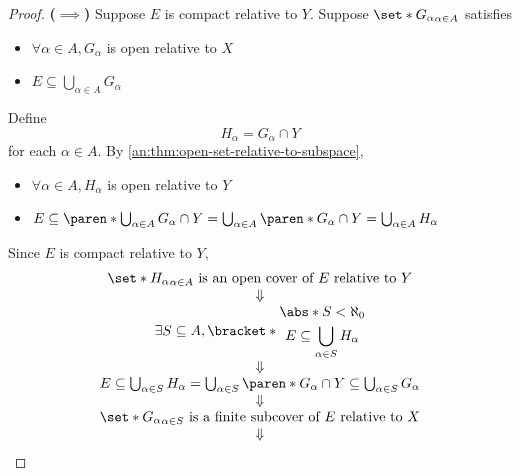 \begin{proof}
  \textbf{($\implies$)} Suppose $E$ is compact relative to $Y$. Suppose $\set*{G_{\alpha}}_{\alpha \in A}$ satisfies
  \begin{itemize}
    \item $\forall \alpha \in A, G_{\alpha}$ is open relative to $X$
    \item $E \subseteq \bigcup_{\alpha \in A} G_{\alpha}$
  \end{itemize}
  Define
  \[
    H_{\alpha} = G_{\alpha} \cap Y
  \]
  for each $\alpha \in A$. By \cref{an:thm:open-set-relative-to-subspace},
  \begin{itemize}
    \item $\forall \alpha \in A, H_{\alpha}$ is open relative to $Y$
    \item $E \subseteq \paren*{\bigcup_{\alpha \in A} G_{\alpha}} \cap Y =
            \bigcup_{\alpha \in A} \paren*{G_{\alpha} \cap Y} = \bigcup_{\alpha \in A} H_{\alpha}$
  \end{itemize}
  Since $E$ is compact relative to $Y$,
  \[
    \begin{array}{c}
      \set*{H_{\alpha}}_{\alpha \in A} \text{ is an open cover of } E \text{ relative to } Y     \\
      \Downarrow                                                                                 \\
      \exists S \subseteq A,
      \bracket*{\begin{gathered}
          \abs*{S} < \aleph_{0} \\
          E \subseteq \bigcup_{\alpha \in S} H_{\alpha}
        \end{gathered}}                                           \\
      \Downarrow                                                                                 \\
      E \subseteq \bigcup_{\alpha \in S} H_{\alpha} = \bigcup_{\alpha \in S}
      \paren*{G_{\alpha} \cap Y} \subseteq \bigcup_{\alpha \in S} G_{\alpha}                     \\
      \Downarrow                                                                                 \\
      \set*{G_{\alpha}}_{\alpha \in S} \text{ is a finite subcover of } E \text{ relative to } X \\
      \Downarrow                                                                                 \\

\end{array}\]
\end{proof}
